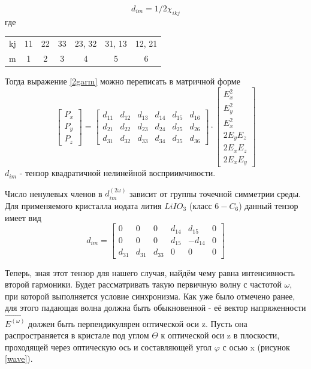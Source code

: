 \documentclass[a4paper,12pt]{article} %
\begin{document}
\begin{equation}
d_{im} = 1/2 \chi_{ikj}
\end{equation}
где
\begin{table}[H]
\begin{tabular}{c c c c c c c}
kj & 11 & 22 & 33 & 23, 32 & 31, 13 & 12, 21 \\
m & 1 & 2 & 3 & 4 & 5 & 6 \\
\end{tabular}
\end{table}

Тогда выражение \eqref{2garm} можно переписать в матричной форме
\begin{equation}
\begin{bmatrix}
P_x \\
P_y \\
P_z
\end{bmatrix}
= 
\begin{bmatrix}
d_{11} & d_{12} & d_{13} & d_{14} & d_{15} & d_{16} \\
d_{21} & d_{22} & d_{23} & d_{24} & d_{25} & d_{26} \\
d_{31} & d_{32} & d_{33} & d_{34} & d_{35} & d_{36}
\end{bmatrix}
\cdot
\begin{bmatrix}
E^2_x \\
E^2_y \\
E^2_x \\
2 E_y E_z \\
2 E_x E_z \\
2 E_x E_y
\end{bmatrix}
\label{mat}
\end{equation}
$d_{im}$ - тензор квадратичной нелинейной восприимчивости.

Число ненулевых членов в $d^{(2\omega)}_{im}$ зависит от группы точечной симметрии среды. Для применяемого кристалла иодата лития $LiIO_3$ (класс $6 - C_6$) данный тензор имеет вид
\begin{equation}
d_{im} =
\begin{bmatrix}
0 & 0 & 0 & d_{14} & d_{15} & 0 \\
0 & 0 & 0 & d_{15} & -d_{14} & 0 \\
d_{31} & d_{31} & d_{33} & 0 & 0 & 0
\end{bmatrix}
\end{equation}

Теперь, зная этот тензор для нашего случая, найдём чему равна интенсивность второй гармоники. Будет рассматривать такую первичную волну с частотой $\omega$, при которой выполняется условие синхронизма. Как уже было отмечено ранее, для этого падающая волна должна быть обыкновенной - её вектор напряженности $\vec{E^{(\omega)}}$ должен быть перпендикулярен оптической оси z. Пусть она распространяется в кристале под углом $\Theta$ к оптической оси z в плоскости, проходящей через оптическую ось и составляющей угол $\varphi$ с осью x (рисунок \ref{wave}).
\end{document}
